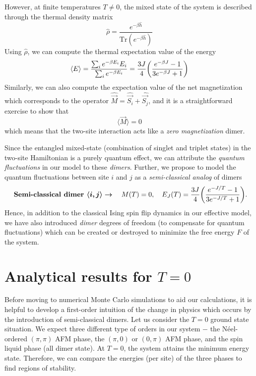 \documentclass[../thesis_main.tex]{subfiles}
\begin{document}
However, at finite temperatures $T \neq 0$, the mixed state of the system is described through the thermal density matrix 
\begin{equation}
    \hat{\rho} = \frac{e^{-\beta \hat{h}}}{\text{Tr} (e^{-\beta \hat{h}})}
\end{equation}
Using $\hat{\rho}$, we can compute the thermal expectation value of the energy 
\begin{equation}
    \expval{E} = \frac{\sum_i e^{-\beta E_i} E_i}{\sum_i e^{-\beta E_i}} = \frac{3J}{4}\qty(\frac{e^{-\beta J} - 1}{3e^{-\beta J} + 1})
\end{equation}
Similarly, we can also compute the expectation value of the net magnetization which corresponds to the operator $\hat{\vec{M}} = \hat{\vec{S_i}} + \hat{\vec{S_j}}$, and it is a straightforward exercise to show that
\begin{equation}
    \langle\vec{M}\rangle = 0 
\end{equation}
which means that the two-site interaction acts like a \textit{zero magnetization} dimer.

Since the entangled mixed-state (combination of singlet and triplet states) in the two-site Hamiltonian is a purely quantum effect, we can attribute the \textit{quantum fluctuations} in our model to these \textit{dimers}. Further, we propose to model the quantum fluctuations between site $i$ and $j$ as a \textit{semi-classical analog} of dimers 
\begin{equation}
    \text{ \textbf{Semi-classical dimer }} \boldsymbol{\langle i,j\rangle \rightarrow} \quad M(T)=0, \quad E_J(T) = \frac{3J}{4}\qty(\frac{e^{-J/T} - 1}{3e^{-J/T} + 1}).
    \label{dimer}
\end{equation}
Hence, in addition to the classical Ising spin flip dynamics in our effective model, we have also introduced \textit{dimer} degrees of freedom (to compensate for quantum fluctuations) which can be created or destroyed to minimize the free energy $F$ of the system.
\section{Analytical results for $T=0$} \label{t=0}
Before moving to numerical Monte Carlo simulations to aid our calculations, it is helpful to develop a first-order intuition of the change in physics which occurs by the introduction of semi-classical dimers.
Let us consider the $T = 0$ ground state situation. We expect three different type of orders in our system $-$ the Néel-ordered $(\pi, \pi)$ AFM phase, the $(\pi, 0)$ or $(0, \pi)$ AFM phase, and the spin liquid phase (all dimer state). At $T = 0$, the system attains the minimum energy state. Therefore, we can compare the energies (per site) of the three phases to find regions of stability.
\end{document}

